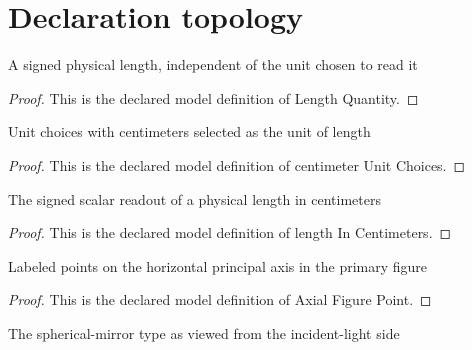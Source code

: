 \section{Declaration topology}
\begin{definition}
  \label{def:physics:phyx-mini-0059:phyxminiproblems-problemphyxmini0059-lengthquantity}
  A signed physical length, independent of the unit chosen to read it
\end{definition}
\begin{proof}
  This is the declared model definition of Length Quantity.
\end{proof}
\begin{definition}
  \label{def:physics:phyx-mini-0059:phyxminiproblems-problemphyxmini0059-centimeterunitchoices}
  Unit choices with centimeters selected as the unit of length
\end{definition}
\begin{proof}
  This is the declared model definition of centimeter Unit Choices.
\end{proof}
\begin{definition}
  \label{def:physics:phyx-mini-0059:phyxminiproblems-problemphyxmini0059-lengthincentimeters}
  The signed scalar readout of a physical length in centimeters
\end{definition}
\begin{proof}
  This is the declared model definition of length In Centimeters.
\end{proof}
\begin{definition}
  \label{def:physics:phyx-mini-0059:phyxminiproblems-problemphyxmini0059-axialfigurepoint}
  Labeled points on the horizontal principal axis in the primary figure
\end{definition}
\begin{proof}
  This is the declared model definition of Axial Figure Point.
\end{proof}
\begin{definition}
  \label{def:physics:phyx-mini-0059:phyxminiproblems-problemphyxmini0059-sphericalmirrorkind}
  The spherical-mirror type as viewed from the incident-light side
\end{definition}
